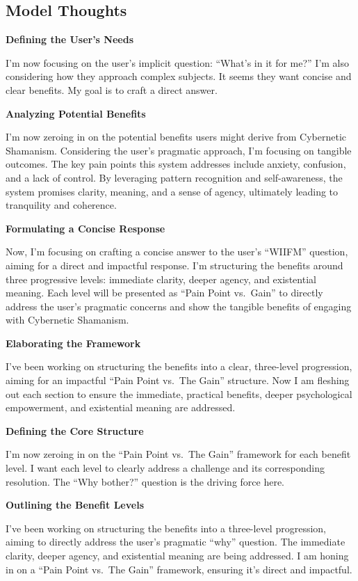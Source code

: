 \documentclass{article}
\begin{document}
\subsection*{Model Thoughts}\label{model-thoughts}

\textbf{Defining the User's Needs}

I'm now focusing on the user's implicit question: ``What's in it for
me?'' I'm also considering how they approach complex subjects. It seems
they want concise and clear benefits. My goal is to craft a direct
answer.

\textbf{Analyzing Potential Benefits}

I'm now zeroing in on the potential benefits users might derive from
Cybernetic Shamanism. Considering the user's pragmatic approach, I'm
focusing on tangible outcomes. The key pain points this system addresses
include anxiety, confusion, and a lack of control. By leveraging pattern
recognition and self-awareness, the system promises clarity, meaning,
and a sense of agency, ultimately leading to tranquility and coherence.

\textbf{Formulating a Concise Response}

Now, I'm focusing on crafting a concise answer to the user's ``WIIFM''
question, aiming for a direct and impactful response. I'm structuring
the benefits around three progressive levels: immediate clarity, deeper
agency, and existential meaning. Each level will be presented as ``Pain
Point vs.~Gain'' to directly address the user's pragmatic concerns and
show the tangible benefits of engaging with Cybernetic Shamanism.

\textbf{Elaborating the Framework}

I've been working on structuring the benefits into a clear, three-level
progression, aiming for an impactful ``Pain Point vs.~The Gain''
structure. Now I am fleshing out each section to ensure the immediate,
practical benefits, deeper psychological empowerment, and existential
meaning are addressed.

\textbf{Defining the Core Structure}

I'm now zeroing in on the ``Pain Point vs.~The Gain'' framework for each
benefit level. I want each level to clearly address a challenge and its
corresponding resolution. The ``Why bother?'' question is the driving
force here.

\textbf{Outlining the Benefit Levels}

I've been working on structuring the benefits into a three-level
progression, aiming to directly address the user's pragmatic ``why''
question. The immediate clarity, deeper agency, and existential meaning
are being addressed. I am honing in on a ``Pain Point vs.~The Gain''
framework, ensuring it's direct and impactful.
\end{document}
